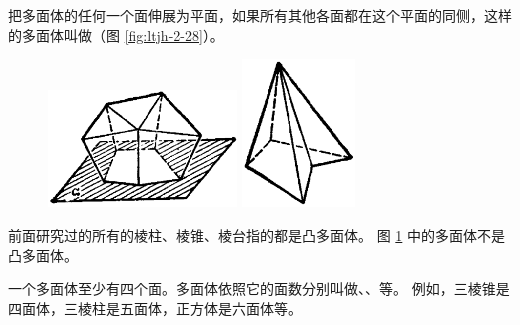 \begin{enhancedline}
把多面体的任何一个面伸展为平面，如果所有其他各面都在这个平面的同侧，这样的多面体叫做（图 \ref{fig:ltjh-2-28}）。

\begin{figure}[htbp]
    \centering
    \begin{minipage}[b]{7cm}
        \centering
        \includegraphics[width=5cm]{../pic/ltjh-ch2-28.png}
        \caption{}\label{fig:ltjh-2-28}
    \end{minipage}
    \qquad
    \begin{minipage}[b]{7cm}
        \centering
        \includegraphics[width=3cm]{../pic/ltjh-ch2-29.png}
        \caption{}\label{fig:ltjh-2-29}
    \end{minipage}
\end{figure}

前面研究过的所有的棱柱、棱锥、棱台指的都是凸多面体。 图 \ref{fig:ltjh-2-29} 中的多面体不是凸多面体。

一个多面体至少有四个面。多面体依照它的面数分别叫做、、等。
例如，三棱锥是四面体，三棱柱是五面体，正方体是六面体等。


\begin{lianxi}



\end{lianxi}

\end{enhancedline}

